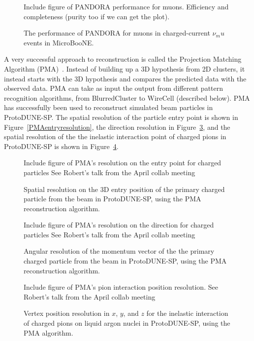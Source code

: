\begin{figure}[htb]
\centering
Include figure of PANDORA performance for muons.  Efficiency and
completeness (purity too if we can get the plot).
\caption{The performance of PANDORA for muons in charged-current
  $\nu_mu$ events in MicroBooNE.  }
\label{fig:muonpandoraperf}
\end{figure}

A very successful approach to reconstruction is called the Projection
Matching Algorithm (PMA)~\cite{pma_algorithm}.  Instead of building up
a 3D hypothesis from 2D clusters, it instead starts with the 3D
hypothesis and compares the predicted data with the observed data.
PMA can take as input the output from different pattern recognition
algorithms, from BlurredCluster to WireCell (described below).  PMA
has successfully been used to reconstruct simulated beam particles in
ProtoDUNE-SP.  The spatial resolution of the particle entry point is
shown in Figure~\ref{PMAentryresolution}, the direction resolution in
Figure~\ref{fig:PMAdirection}, and the spatial resolution of the the
inelastic interaction point of charged pions in ProtoDUNE-SP is shown
in Figure~\ref{fig:PMApioninteraction}.

\begin{figure}[htb]
\centering
Include figure of PMA's resolution on the entry point for charged
particles See Robert's talk from the April collab meeting
\caption{Spatial resolution on the 3D entry position of the primary
  charged particle from the beam in ProtoDUNE-SP, using the PMA
  reconstruction algorithm.}
\label{fig:PMAentryresolution}
\end{figure}

\begin{figure}[htb]
\centering
Include figure of PMA's resolution on the direction for charged
particles See Robert's talk from the April collab meeting
\caption{Angular resolution of the momentum vector of the the primary
  charged particle from the beam in ProtoDUNE-SP, using the PMA
  reconstruction algorithm.}
\label{fig:PMAdirection}
\end{figure}

\begin{figure}[htb]
\centering
Include figure of PMA's pion interaction position resolution.  See
Robert's talk from the April collab meeting
\caption{Vertex position resolution in $x$, $y$, and $z$ for the
  inelastic interaction of charged pions on liquid argon nuclei in
  ProtoDUNE-SP, using the PMA algorithm.}
\label{fig:PMApioninteraction}
\end{figure}
